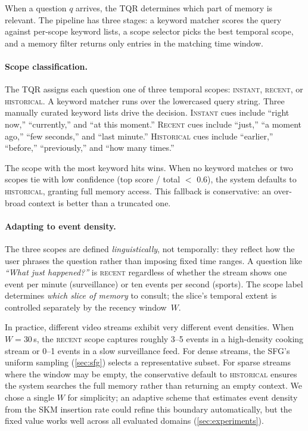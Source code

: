 When a question $q$ arrives, the TQR determines which part of memory is relevant.
The pipeline has three stages: a keyword matcher scores the query against per-scope keyword lists, a scope selector picks the best temporal scope, and a memory filter returns only entries in the matching time window.

\paragraph{Scope classification.}
The TQR assigns each question one of three temporal scopes: \textsc{instant}, \textsc{recent}, or \textsc{historical}.
A keyword matcher runs over the lowercased query string.
Three manually curated keyword lists drive the decision. \textsc{Instant} cues include ``right now,'' ``currently,'' and ``at this moment.'' \textsc{Recent} cues include ``just,'' ``a moment ago,'' ``few seconds,'' and ``last minute.'' \textsc{Historical} cues include ``earlier,'' ``before,'' ``previously,'' and ``how many times.''

The scope with the most keyword hits wins. When no keyword matches or two scopes tie with low confidence (top score / total $<$ 0.6), the system defaults to \textsc{historical}, granting full memory access. This fallback is conservative: an over-broad context is better than a truncated one.

\paragraph{Adapting to event density.}
The three scopes are defined \emph{linguistically}, not temporally: they reflect how the user phrases the question rather than imposing fixed time ranges.
A question like \emph{``What just happened?''} is \textsc{recent} regardless of whether the stream shows one event per minute (surveillance) or ten events per second (sports).
The scope label determines \emph{which slice of memory} to consult; the slice's temporal extent is controlled separately by the recency window~$W$.

In practice, different video streams exhibit very different event densities.
When $W = 30$\,s, the \textsc{recent} scope captures roughly 3--5 events in a high-density cooking stream or 0--1 events in a slow surveillance feed.
For dense streams, the SFG's uniform sampling (\cref{sec:sfg}) selects a representative subset.
For sparse streams where the window may be empty, the conservative default to \textsc{historical} ensures the system searches the full memory rather than returning an empty context.
We chose a single $W$ for simplicity; an adaptive scheme that estimates event density from the SKM insertion rate could refine this boundary automatically, but the fixed value works well across all evaluated domains (\cref{sec:experiments}).

